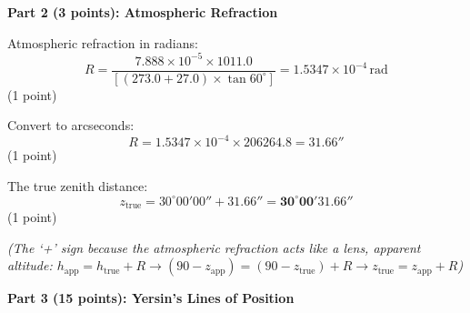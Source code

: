 \medskip\noindent\textbf{Part 2 (3 points): Atmospheric Refraction}

Atmospheric refraction in radians:
\[
R = \frac{7.888 \times 10^{-5} \times 1011.0}
         {[(273.0 + 27.0) \times \tan 60^\circ]}
  = 1.5347 \times 10^{-4}\,\mathrm{rad}
\]
\hfill(1 point)

Convert to arcseconds:
\[
R = 1.5347 \times 10^{-4} \times 206264.8 = \mathbf{31.66''}
\]
\hfill(1 point)

The true zenith distance:
\[
z_{\mathrm{true}} = 30^\circ 00' 00'' + 31.66'' = \mathbf{30^\circ 00' 31.66''}
\]
\hfill(1 point)

\emph{(The `+' sign because the atmospheric refraction acts like a lens,
apparent altitude: $h_{\mathrm{app}} = h_{\mathrm{true}} + R \rightarrow
(90 - z_{\mathrm{app}}) = (90 - z_{\mathrm{true}}) + R \rightarrow
z_{\mathrm{true}} = z_{\mathrm{app}} + R$)}

\medskip\noindent\textbf{Part 3 (15 points): Yersin's Lines of Position}

